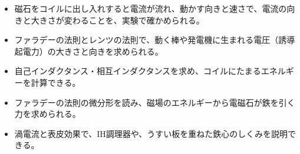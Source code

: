 \begin{goal}
\begin{itemize}[label={\color{bkTheme}●}, leftmargin=1.6\zw, itemsep=0pt, topsep=1pt]
\item {}\enspace 磁石をコイルに出し入れすると電流が流れ、動かす向きと速さで、電流の向きと大きさが変わることを、実験で確かめられる。
\item {}\enspace ファラデーの法則とレンツの法則で、動く棒や発電機に生まれる電圧（誘導起電力）の大きさと向きを求められる。
\item {}\enspace 自己インダクタンス・相互インダクタンスを求め、コイルにたまるエネルギーを計算できる。
\item {}\enspace ファラデーの法則の微分形を読み、磁場のエネルギーから電磁石が鉄を引く力を求められる。
\item {}\enspace 渦電流と表皮効果で、IH調理器や、うすい板を重ねた鉄心のしくみを説明できる。
\end{itemize}
\end{goal}


